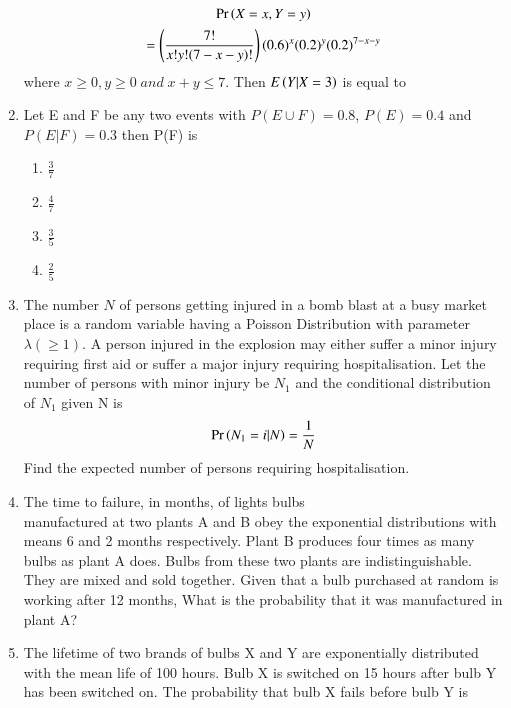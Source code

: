 \documentclass[journal,12pt,twocolumn]{IEEEtran}
\begin{document}
\begin{enumerate}
\begin{multline}
    \nonumber \Pr\left(X=x,Y=y\right)\\=\left(\frac{7!}{x!y!(7-x-y)!}\right)(0.6)^x(0.2)^y(0.2)^{7-x-y}
\end{multline}
where $x\geq0 , y\geq0 \;and\; {x+y}\leq7$.
Then $E\left(Y|X=3\right)$ is equal to
%
\\
\solution

\item Let E and F be any two events with $P(E \cup F) = 0.8$, $P(E) = 0.4$ and $P(E|F) = 0.3$ then P(F) is \newline
\begin{enumerate}
\item $\frac{3}{7}$ 
\item $\frac{4}{7}$ 
\item $\frac{3}{5}$ 
\item $\frac{2}{5}$ 
\end{enumerate}
%
\solution

%
\item The number $N$ of persons getting injured in a bomb blast at a busy market place is a random variable having a Poisson Distribution with parameter $\lambda(\geq 1)$.
 A person injured in the explosion may either suffer a minor injury requiring first aid or suffer a major injury requiring hospitalisation. Let the number of persons with minor injury be $N_1$ and the conditional distribution of $N_1$ given N is
 \begin{align}
     \Pr\left(N_1 = i \vert N\right) = \frac{1}{N}
     \label{condition}
 \end{align}
 Find the expected number of persons requiring hospitalisation.
\solution

 \item The time to failure, in months, of lights bulbs \\manufactured at two plants A and B
obey the exponential distributions with means 6 and 2 months respectively. Plant B produces
four times as many bulbs as plant A does. Bulbs from these two plants are indistinguishable.
They are mixed and sold together. Given that a bulb purchased at random is working after 12 months, What is the probability that it was manufactured in plant A?
\\
\solution

\item The lifetime of two brands of bulbs X and Y are exponentially distributed with the mean life of 100 hours. Bulb X is switched on 15 hours after bulb Y has been switched on. The probability that bulb X fails before bulb Y is 

\end{enumerate}
\end{document}
